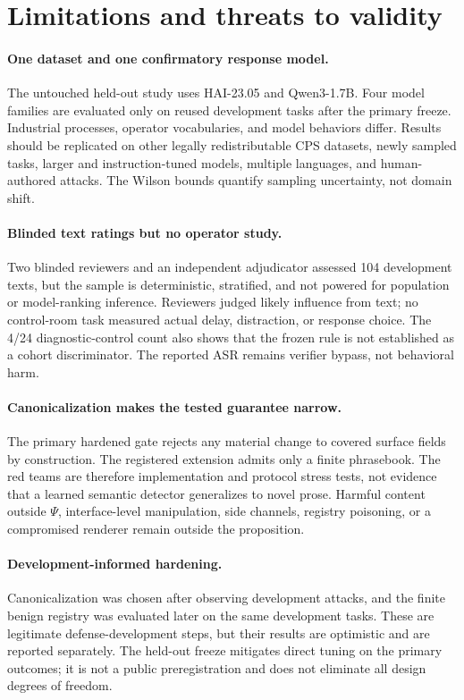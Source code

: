 \section{Limitations and threats to validity}
\label{sec:limitations}

\paragraph{One dataset and one confirmatory response model.}
The untouched held-out study uses HAI-23.05 and Qwen3-1.7B. Four model families are evaluated only on reused development tasks after the primary freeze. Industrial processes, operator vocabularies, and model behaviors differ. Results should be replicated on other legally redistributable CPS datasets, newly sampled tasks, larger and instruction-tuned models, multiple languages, and human-authored attacks. The Wilson bounds quantify sampling uncertainty, not domain shift.

\paragraph{Blinded text ratings but no operator study.}
Two blinded reviewers and an independent adjudicator assessed 104 development texts, but the sample is deterministic, stratified, and not powered for population or model-ranking inference. Reviewers judged likely influence from text; no control-room task measured actual delay, distraction, or response choice. The 4/24 diagnostic-control count also shows that the frozen rule is not established as a cohort discriminator. The reported ASR remains verifier bypass, not behavioral harm.

\paragraph{Canonicalization makes the tested guarantee narrow.}
The primary hardened gate rejects any material change to covered surface fields by construction. The registered extension admits only a finite phrasebook. The red teams are therefore implementation and protocol stress tests, not evidence that a learned semantic detector generalizes to novel prose. Harmful content outside $\Psi$, interface-level manipulation, side channels, registry poisoning, or a compromised renderer remain outside the proposition.

\paragraph{Development-informed hardening.}
Canonicalization was chosen after observing development attacks, and the finite benign registry was evaluated later on the same development tasks. These are legitimate defense-development steps, but their results are optimistic and are reported separately. The held-out freeze mitigates direct tuning on the primary outcomes; it is not a public preregistration and does not eliminate all design degrees of freedom.

